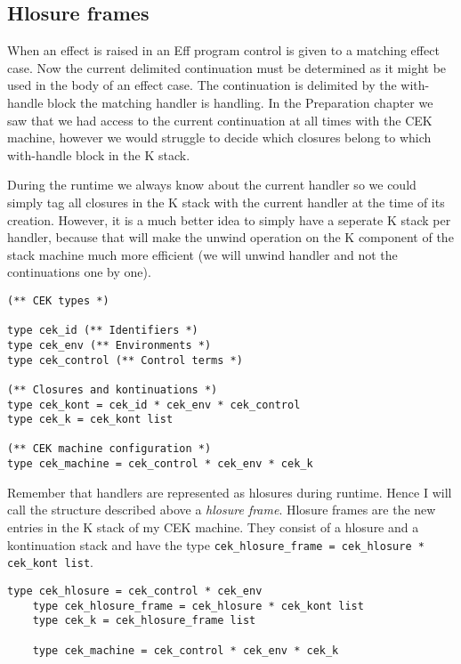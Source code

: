 \documentclass[class=article, crop=false]{standalone}
\begin{document}
\subsection{Hlosure frames}

When an effect is raised in an Eff program control is given to a matching effect case.
Now the current delimited continuation must be determined as it might be used in the body
of an effect case. The continuation is delimited by the with-handle block the matching
handler is handling. In the Preparation chapter we saw that we had access to the current
continuation at all times with the CEK machine, however we would struggle to decide which
closures belong to which with-handle block in the K stack.

During the runtime we always know about the current handler so we could simply tag all
closures in the K stack with the current handler at the time of its creation. However,
it is a much better idea to simply have a seperate K stack per handler, because
that will make the unwind operation on the K component of the stack machine much more efficient
(we will unwind handler and not the continuations one by one).

\begin{lstlisting}[language=caml]
(** CEK types *)

type cek_id (** Identifiers *)
type cek_env (** Environments *)
type cek_control (** Control terms *)

(** Closures and kontinuations *)
type cek_kont = cek_id * cek_env * cek_control
type cek_k = cek_kont list

(** CEK machine configuration *)
type cek_machine = cek_control * cek_env * cek_k
\end{lstlisting}

Remember that handlers are represented as hlosures during runtime. Hence I will call the
structure described above a \emph{hlosure frame}. Hlosure frames are the new entries in
the K stack of my CEK machine. They consist of a hlosure and a kontinuation stack and
have the type \verb|cek_hlosure_frame = cek_hlosure * cek_kont list|.

\begin{lstlisting}[language=caml]
    type cek_hlosure = cek_control * cek_env
    type cek_hlosure_frame = cek_hlosure * cek_kont list
    type cek_k = cek_hlosure_frame list

    type cek_machine = cek_control * cek_env * cek_k
\end{lstlisting}
\end{document}
